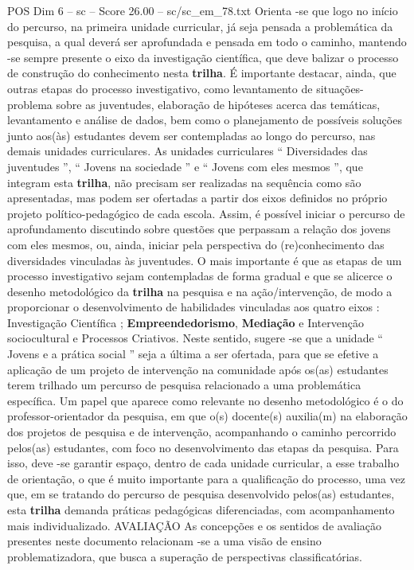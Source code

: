 \begin{textsample}{POS Dim 6 – sc – Score 26.00 – sc/sc\_em\_78.txt}
Orienta -se que logo no início do percurso, na primeira unidade curricular, já seja pensada a problemática da pesquisa, a qual deverá ser aprofundada e pensada em todo o caminho, mantendo -se sempre presente o eixo da investigação científica, que deve balizar o processo de construção do conhecimento nesta \textbf{trilha}.
É importante destacar, ainda, que outras etapas do processo investigativo, como levantamento de situações-problema sobre as juventudes, elaboração de hipóteses acerca das temáticas, levantamento e análise de dados, bem como o planejamento de possíveis soluções junto aos(às) estudantes devem ser contempladas ao longo do percurso, nas demais unidades curriculares.
As unidades curriculares “ Diversidades das juventudes ”, “ Jovens na sociedade ” e “ Jovens com eles mesmos ”, que integram esta \textbf{trilha}, não precisam ser realizadas na sequência como são apresentadas, mas podem ser ofertadas a partir dos eixos definidos no próprio projeto político-pedagógico de cada escola.
Assim, é possível iniciar o percurso de aprofundamento discutindo sobre questões que perpassam a relação dos jovens com eles mesmos, ou, ainda, iniciar pela perspectiva do (re)conhecimento das diversidades vinculadas às juventudes.
O mais importante é que as etapas de um processo investigativo sejam contempladas de forma gradual e que se alicerce o desenho metodológico da \textbf{trilha} na pesquisa e na ação/intervenção, de modo a proporcionar o desenvolvimento de habilidades vinculadas aos quatro eixos : Investigação Científica ; \textbf{Empreendedorismo}, \textbf{Mediação} e Intervenção sociocultural e Processos Criativos.
Neste sentido, sugere -se que a unidade “ Jovens e a prática social ” seja a última a ser ofertada, para que se efetive a aplicação de um projeto de intervenção na comunidade após os(as) estudantes terem trilhado um percurso de pesquisa relacionado a uma problemática específica.
Um papel que aparece como relevante no desenho metodológico é o do professor-orientador da pesquisa, em que o(s) docente(s) auxilia(m) na elaboração dos projetos de pesquisa e de intervenção, acompanhando o caminho percorrido pelos(as) estudantes, com foco no desenvolvimento das etapas da pesquisa.
Para isso, deve -se garantir espaço, dentro de cada unidade curricular, a esse trabalho de orientação, o que é muito importante para a qualificação do processo, uma vez que, em se tratando do percurso de pesquisa desenvolvido pelos(as) estudantes, esta \textbf{trilha} demanda práticas pedagógicas diferenciadas, com acompanhamento mais individualizado.
AVALIAÇÃO As concepções e os sentidos de avaliação presentes neste documento relacionam -se a uma visão de ensino problematizadora, que busca a superação de perspectivas classificatórias.

\end{textsample}
